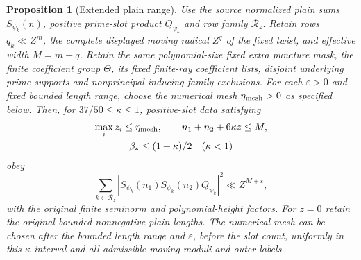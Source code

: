 \documentclass[11pt,a4paper]{article}
\newtheorem{proposition}[theorem]{Proposition}
\theoremstyle{definition}
\newcommand{\eps}{\varepsilon}
\newcommand{\bet}{\beta_*}
\begin{document}
\begin{proposition}[Extended plain range]\label{prop:plain}
Use the source normalized plain sums $S_{\psi_k}(n)$, positive
prime-slot product $Q_{\psi_k}$ and row family $\mathcal R_z$.
Retain rows $q_k\ll Z^m$, the complete displayed moving radical
$Z^q$ of the fixed twist, and effective width $M=m+q$.
Retain the same polynomial-size fixed extra puncture mask,
the finite coefficient group $\Theta$, its fixed finite-ray
coefficient lists, disjoint underlying prime supports and
nonprincipal inducing-family exclusions.
For each $\eps>0$ and fixed bounded length range, choose the
numerical mesh $\eta_{\rm mesh}>0$ as specified below.
Then, for $37/50\le\kappa\le1$, positive-slot data satisfying
\[
\begin{gathered}
 \max_i z_i\le\eta_{\rm mesh},\qquad n_1+n_2+6\kappa z\le M,\\
 \bet\le(1+\kappa)/2\quad(\kappa<1)
\end{gathered}
\]
obey
\begin{equation}\label{eq:plain}
 \sum_{k\in\mathcal R_z}
 |S_{\psi_k}(n_1)S_{\psi_k}(n_2)Q_{\psi_k}|^2
 \ll Z^{M+\eps},
\end{equation}
with the original finite seminorm and polynomial-height factors.
For $z=0$ retain the original bounded nonnegative plain lengths.
The numerical mesh can be chosen after the bounded length range and
$\eps$, before the slot count, uniformly in this $\kappa$ interval
and all admissible moving moduli and outer labels.
\end{proposition}
\end{document}
